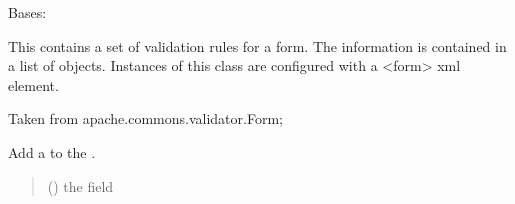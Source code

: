 \documentclass[letterpaper,10pt,english]{sphinxmanual}
\begin{document}
\begin{fulllineitems}
\label{\detokenize{apache_commons_validator_python:apache_commons_validator_python.form_new.Form}}
\pysigstartsignatures
{}
\pysigstopsignatures
\sphinxAtStartPar
Bases: 

\sphinxAtStartPar
This contains a set of validation rules for a form. The information is contained
in a list of  objects. Instances of this class are configured with a \textless{}form\textgreater{}
xml element.

\sphinxAtStartPar
Taken from apache.commons.validator.Form;

\begin{fulllineitems}
\label{\detokenize{apache_commons_validator_python:apache_commons_validator_python.form_new.Form.add_field}}
\pysigstartsignatures
{}
\pysigstopsignatures
\sphinxAtStartPar
Add a  to the .
\begin{quote}\begin{description}
\sphinxAtStartPar
{} ({\hyperref[\detokenize{apache_commons_validator_python:apache_commons_validator_python.field_new.Field}]{}}) \textendash{} the field

\end{description}\end{quote}

\end{fulllineitems}


\begin{fulllineitems}
\label{\detokenize{apache_commons_validator_python:apache_commons_validator_python.form_new.Form.cloneable}}
\pysigstartsignatures
{}
\pysigstopsignatures
\end{fulllineitems}


\end{fulllineitems}
\end{document}

